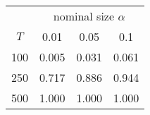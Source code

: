 % 
\begin{tabular}{cccc}
  \hline
  & \multicolumn{3}{c}{nominal size $\alpha$} \\
 $T$ & 0.01 & 0.05 & 0.1 \\
 \hline
100 & 0.005 & 0.031 & 0.061 \\ 
  250 & 0.717 & 0.886 & 0.944 \\ 
  500 & 1.000 & 1.000 & 1.000 \\ 
   \hline
\end{tabular}
